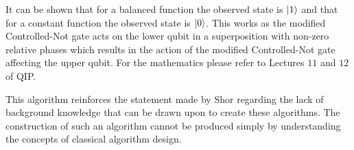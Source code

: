 It can be shown that for a balanced function the observed state is $\left\vert{1}\right\rangle$ and that for a constant function the observed state is $\left\vert{0}\right\rangle$.
This works as the modified Controlled-Not gate acts on the lower qubit in a superposition with non-zero relative phases which results in the action of the modified Controlled-Not gate affecting the upper qubit.
% 
% 
% 
For the mathematics please refer to Lectures $11$ and $12$ of QIP\cite{QIPLect}.

This algorithm reinforces the statement made by Shor\cite{Shor:2004:PQA:1032132.1032149} regarding the lack of background knowledge that can be drawn upon to create these algorithms.
The construction of such an algorithm cannot be produced simply by understanding the concepts of classical algorithm design.

